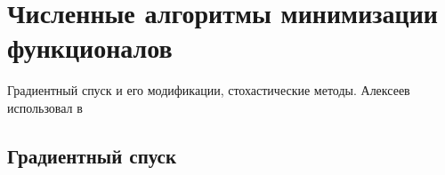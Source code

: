 \section{Численные алгоритмы минимизации функционалов}\label{sec:ch4/sec2}
Градиентный спуск и его модификации, стохастические методы.
Алексеев использовал в~\cite{Alekseev2019Simulation}
\subsection{Градиентный спуск}\label{subsec:ch4/sec2/subsec1}
